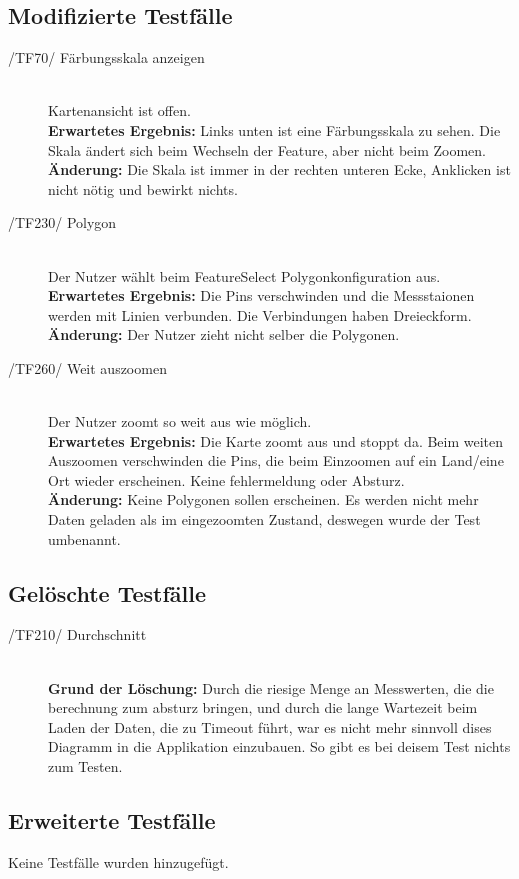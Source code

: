 \subsection{Modifizierte Testfälle}
\begin{description}
   	\item[/TF70/ Färbungsskala anzeigen] \hfill  \\  Kartenansicht ist offen. \\ \textbf{Erwartetes Ergebnis:} Links unten ist eine Färbungsskala zu sehen. Die Skala ändert sich beim Wechseln der Feature, aber nicht beim Zoomen. \\
\textbf{Änderung:} Die Skala ist immer in der rechten unteren Ecke, Anklicken ist nicht nötig und bewirkt nichts.

   	\item[/TF230/ Polygon] \hfill \\ Der Nutzer wählt beim FeatureSelect Polygonkonfiguration aus. \\ \textbf{Erwartetes Ergebnis:} Die Pins verschwinden und die Messstaionen werden mit Linien verbunden. Die Verbindungen haben Dreieckform. \\
\textbf{Änderung:} Der Nutzer zieht nicht selber die Polygonen.

\item[/TF260/ Weit auszoomen] \hfill \\ Der Nutzer zoomt so weit aus wie möglich.\\ \textbf{Erwartetes Ergebnis:} Die Karte zoomt aus und stoppt da. Beim weiten Auszoomen verschwinden die Pins, die beim Einzoomen auf ein Land/eine Ort wieder erscheinen. Keine fehlermeldung oder Absturz. \\
\textbf{Änderung:} Keine Polygonen sollen erscheinen. Es werden nicht mehr Daten geladen als im eingezoomten Zustand, deswegen wurde der Test umbenannt.
\end{description}

\subsection{Gelöschte Testfälle}
\begin{description}
   	\item[/TF210/ Durchschnitt] \hfill \\ \textbf{Grund der Löschung:} Durch die riesige Menge an Messwerten, die die berechnung zum absturz bringen, und durch die lange Wartezeit beim Laden der Daten, die zu Timeout führt, war es nicht mehr sinnvoll dises Diagramm in die Applikation einzubauen. So gibt es bei deisem Test nichts zum Testen. 

\end{description}


\subsection{Erweiterte Testfälle}

Keine Testfälle wurden hinzugefügt.

	





